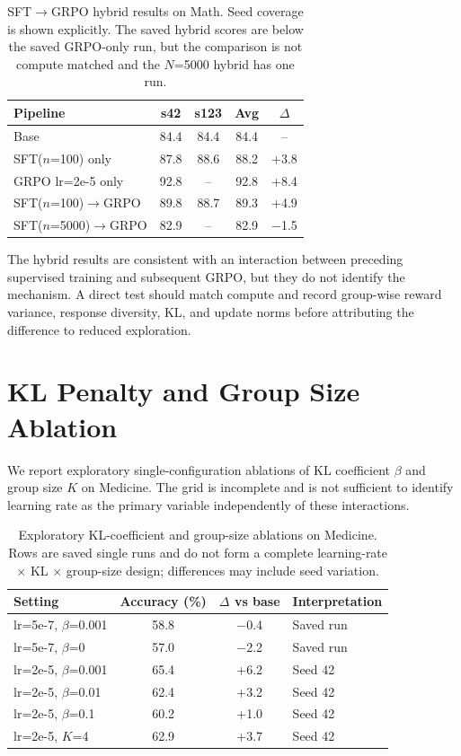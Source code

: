 \documentclass[11pt]{article}
\begin{document}
\begin{table}[h]
\centering
\small
\begin{tabular}{@{}lcccc@{}}
\toprule
\textbf{Pipeline} & \textbf{s42} & \textbf{s123} & \textbf{Avg} & \textbf{$\Delta$} \\
\midrule
Base & 84.4 & 84.4 & 84.4 & -- \\
SFT($n$=100) only & 87.8 & 88.6 & 88.2 & +3.8 \\
GRPO lr=2e-5 only & 92.8 & -- & 92.8 & +8.4 \\
SFT($n$=100)$\to$GRPO & 89.8 & 88.7 & 89.3 & +4.9 \\
SFT($n$=5000)$\to$GRPO & 82.9 & -- & 82.9 & $-$1.5 \\
\bottomrule
\end{tabular}
\caption{SFT$\to$GRPO hybrid results on Math. Seed coverage is shown explicitly. The saved hybrid scores are below the saved GRPO-only run, but the comparison is not compute matched and the $N$=5000 hybrid has one run.}
\label{tab:hybrid_full}
\end{table}

The hybrid results are consistent with an interaction between preceding supervised training and subsequent GRPO, but they do not identify the mechanism. A direct test should match compute and record group-wise reward variance, response diversity, KL, and update norms before attributing the difference to reduced exploration.

\section{KL Penalty and Group Size Ablation}
\label{sec:kl_ablation}

We report exploratory single-configuration ablations of KL coefficient $\beta$ and group size $K$ on Medicine. The grid is incomplete and is not sufficient to identify learning rate as the primary variable independently of these interactions.

\begin{table}[h]
\centering
\small
\begin{tabular}{@{}lccl@{}}
\toprule
\textbf{Setting} & \textbf{Accuracy (\%)} & \textbf{$\Delta$ vs base} & \textbf{Interpretation} \\
\midrule
lr=5e-7, $\beta$=0.001 & 58.8 & $-$0.4 & Saved run \\
lr=5e-7, $\beta$=0 & 57.0 & $-$2.2 & Saved run \\
\midrule
lr=2e-5, $\beta$=0.001 & 65.4 & +6.2 & Seed 42 \\
lr=2e-5, $\beta$=0.01 & 62.4 & +3.2 & Seed 42 \\
lr=2e-5, $\beta$=0.1 & 60.2 & +1.0 & Seed 42 \\
lr=2e-5, $K$=4 & 62.9 & +3.7 & Seed 42 \\
\bottomrule
\end{tabular}
\caption{Exploratory KL-coefficient and group-size ablations on Medicine. Rows are saved single runs and do not form a complete learning-rate $\times$ KL $\times$ group-size design; differences may include seed variation.}
\label{tab:kl_ablation}
\end{table}
\end{document}
